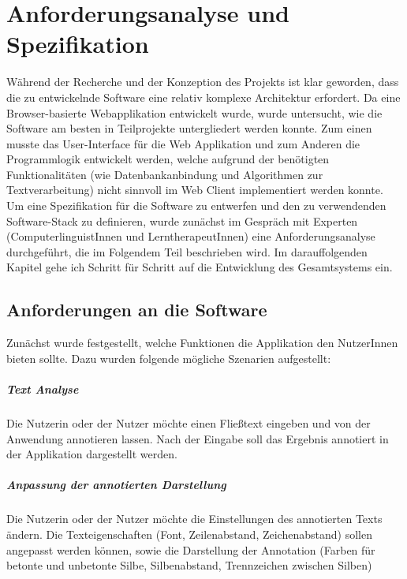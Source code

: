 
\chapter{Anforderungsanalyse und Spezifikation}
\label{sec:specification}

Während der Recherche und der Konzeption des Projekts ist klar geworden, dass die zu entwickelnde Software eine relativ komplexe Architektur erfordert. Da eine Browser-basierte Webapplikation entwickelt wurde, wurde untersucht, wie die Software am besten in Teilprojekte untergliedert werden konnte. Zum einen musste das User-Interface für die Web Applikation und zum Anderen die Programmlogik entwickelt werden, welche aufgrund der benötigten Funktionalitäten (wie Datenbankanbindung und Algorithmen zur Textverarbeitung) nicht sinnvoll im Web Client implementiert werden konnte.\\
Um eine Spezifikation für die Software zu entwerfen und den zu verwendenden Software-Stack zu definieren, wurde zunächst im Gespräch mit Experten (ComputerlinguistInnen und LerntherapeutInnen) eine Anforderungsanalyse durchgeführt, die im Folgendem Teil beschrieben wird. Im darauffolgenden Kapitel gehe ich Schritt für Schritt auf die Entwicklung des Gesamtsystems ein.

\section{Anforderungen an die Software}

Zunächst wurde festgestellt, welche Funktionen die Applikation den NutzerInnen bieten sollte. Dazu wurden folgende mögliche Szenarien aufgestellt:

\paragraph{Text Analyse} 
Die Nutzerin oder der Nutzer möchte einen Fließtext eingeben und von der Anwendung annotieren lassen. Nach der Eingabe soll das Ergebnis annotiert in der Applikation dargestellt werden.

\paragraph{Anpassung der annotierten Darstellung}
Die Nutzerin oder der Nutzer möchte die Einstellungen des annotierten Texts ändern. Die Texteigenschaften (Font, Zeilenabstand, Zeichenabstand) sollen angepasst werden können, sowie die Darstellung der Annotation (Farben für betonte und unbetonte Silbe, Silbenabstand, Trennzeichen zwischen Silben)

